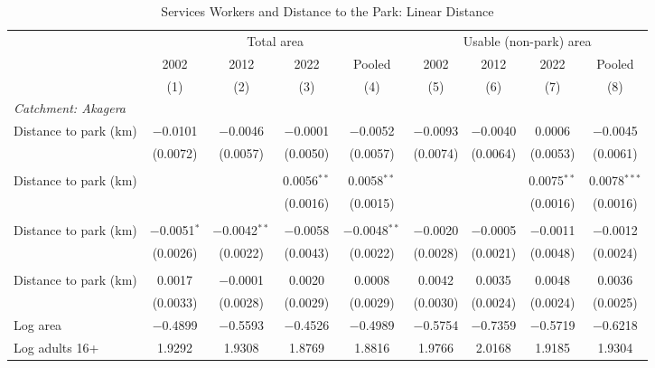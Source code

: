 \documentclass[11pt]{article}
\begin{document}
\begin{table}[H]
\centering\footnotesize\setlength{\tabcolsep}{4pt}
\caption{Services Workers and Distance to the Park: Linear Distance}
\label{tab:dist_linear_services}
\begin{adjustbox}{max width=\textwidth, max totalheight=0.8\textheight}
\begin{tabular}{lcccccccc}
\toprule
 & \multicolumn{4}{c}{Total area} & \multicolumn{4}{c}{Usable (non-park) area} \\
\cmidrule(lr){2-5} \cmidrule(lr){6-9}
 & 2002 & 2012 & 2022 & Pooled & 2002 & 2012 & 2022 & Pooled \\
 & (1) & (2) & (3) & (4) & (5) & (6) & (7) & (8) \\
\midrule
\multicolumn{9}{l}{\textit{Catchment: Akagera}} \\
\quad Distance to park (km) & $-$0.0101 & $-$0.0046 & $-$0.0001 & $-$0.0052 & $-$0.0093 & $-$0.0040 & 0.0006 & $-$0.0045 \\
 & (0.0072) & (0.0057) & (0.0050) & (0.0057) & (0.0074) & (0.0064) & (0.0053) & (0.0061) \\
\addlinespace
\multicolumn{9}{l}{\textit{Catchment: Gishwati--Mukura}} \\
\quad Distance to park (km) &  &  & 0.0056$^{**}$ & 0.0058$^{**}$ &  &  & 0.0075$^{**}$ & 0.0078$^{***}$ \\
 &  &  & (0.0016) & (0.0015) &  &  & (0.0016) & (0.0016) \\
\addlinespace
\multicolumn{9}{l}{\textit{Catchment: Nyungwe}} \\
\quad Distance to park (km) & $-$0.0051$^{*}$ & $-$0.0042$^{**}$ & $-$0.0058 & $-$0.0048$^{**}$ & $-$0.0020 & $-$0.0005 & $-$0.0011 & $-$0.0012 \\
 & (0.0026) & (0.0022) & (0.0043) & (0.0022) & (0.0028) & (0.0021) & (0.0048) & (0.0024) \\
\addlinespace
\multicolumn{9}{l}{\textit{Catchment: Volcanoes}} \\
\quad Distance to park (km) & 0.0017 & $-$0.0001 & 0.0020 & 0.0008 & 0.0042 & 0.0035 & 0.0048 & 0.0036 \\
 & (0.0033) & (0.0028) & (0.0029) & (0.0029) & (0.0030) & (0.0024) & (0.0024) & (0.0025) \\
\addlinespace
\midrule
Log area & $-$0.4899 & $-$0.5593 & $-$0.4526 & $-$0.4989 & $-$0.5754 & $-$0.7359 & $-$0.5719 & $-$0.6218 \\
Log adults 16+ & 1.9292 & 1.9308 & 1.8769 & 1.8816 & 1.9766 & 2.0168 & 1.9185 & 1.9304 \\

\end{tabular}
\end{adjustbox}
\end{table}
\end{document}

